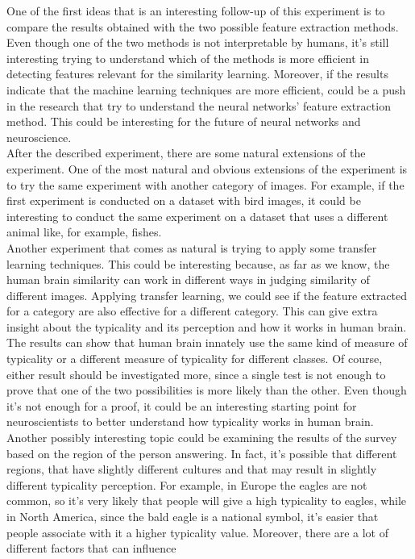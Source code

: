 \documentclass[conference]{IEEEtran}
\begin{document}
			\noindent One of the first ideas that is an interesting follow-up of this experiment is to compare the results obtained with the two possible feature extraction methods. Even though one of the two methods is not 
			interpretable by humans, it's still interesting trying to understand which of the methods is more efficient in detecting features relevant for the similarity learning. Moreover, if the results 
			indicate that the machine learning techniques are more efficient, could be a push in the research that try to understand the neural networks' feature extraction method. This could be interesting 
			for the future of neural networks and neuroscience. \\
			After the described experiment, there are some natural extensions of the experiment. One of the most natural and obvious extensions of the experiment is to try the same experiment with another category 
			of images. For example, if the first experiment is conducted on a dataset with bird images, it could be interesting to conduct the same experiment on a dataset that uses a different animal like, for 
			example, fishes.\\
			Another experiment that comes as natural is trying to apply some transfer learning techniques. This could be interesting because, as far as we know, the human brain similarity can work 
			in different ways in judging similarity of different images. Applying transfer learning, we could see if the feature extracted for a category are also effective for a different category. This can give 
			extra insight about the typicality and its perception and how it works in human brain. The results can show that human brain innately use the same kind of measure of typicality or a different measure of 
			typicality for different classes. Of course, either result should be investigated more, since a single test is not enough to prove that one of the two possibilities is more likely than the other. Even though 
			it's not enough for a proof, it could be an interesting starting point for neuroscientists to better understand how typicality works in human brain.\\
			Another possibly interesting topic could be examining the results of the survey based on the region of the person answering. In fact, it's possible that different regions, that have slightly different 
			cultures and that may result in slightly different typicality perception. For example, in Europe the eagles are not common, so it's very likely that people will give a high typicality to eagles, while 
			in North America, since the bald eagle is a national symbol, it's easier that people associate with it a higher typicality value. Moreover, there are a lot of different factors that can influence 
\end{document}
